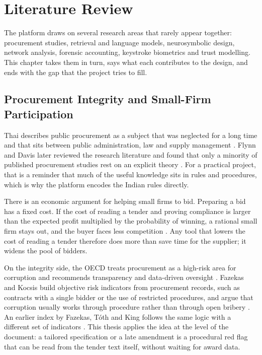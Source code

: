 \chapter{Literature Review}
\label{ch:literature}

The platform draws on several research areas that rarely appear together: procurement studies, retrieval and language models, neurosymbolic design, network analysis, forensic accounting, keystroke biometrics and trust modelling. This chapter takes them in turn, says what each contributes to the design, and ends with the gap that the project tries to fill.

\section{Procurement Integrity and Small-Firm Participation}
Thai describes public procurement as a subject that was neglected for a long time and that sits between public administration, law and supply management \cite{thai2001public}. Flynn and Davis later reviewed the research literature and found that only a minority of published procurement studies rest on an explicit theory \cite{flynn2014theory}. For a practical project, that is a reminder that much of the useful knowledge sits in rules and procedures, which is why the platform encodes the Indian rules directly.

There is an economic argument for helping small firms to bid. Preparing a bid has a fixed cost. If the cost of reading a tender and proving compliance is larger than the expected profit multiplied by the probability of winning, a rational small firm stays out, and the buyer faces less competition \cite{dimitri2006handbook}. Any tool that lowers the cost of reading a tender therefore does more than save time for the supplier; it widens the pool of bidders.

On the integrity side, the OECD treats procurement as a high-risk area for corruption and recommends transparency and data-driven oversight \cite{oecd2015recommendation}. Fazekas and Kocsis build objective risk indicators from procurement records, such as contracts with a single bidder or the use of restricted procedures, and argue that corruption usually works through procedure rather than through open bribery \cite{fazekas2020uncovering}. An earlier index by Fazekas, T\'oth and King follows the same logic with a different set of indicators \cite{fazekas2016objective}. This thesis applies the idea at the level of the document: a tailored specification or a late amendment is a procedural red flag that can be read from the tender text itself, without waiting for award data.

